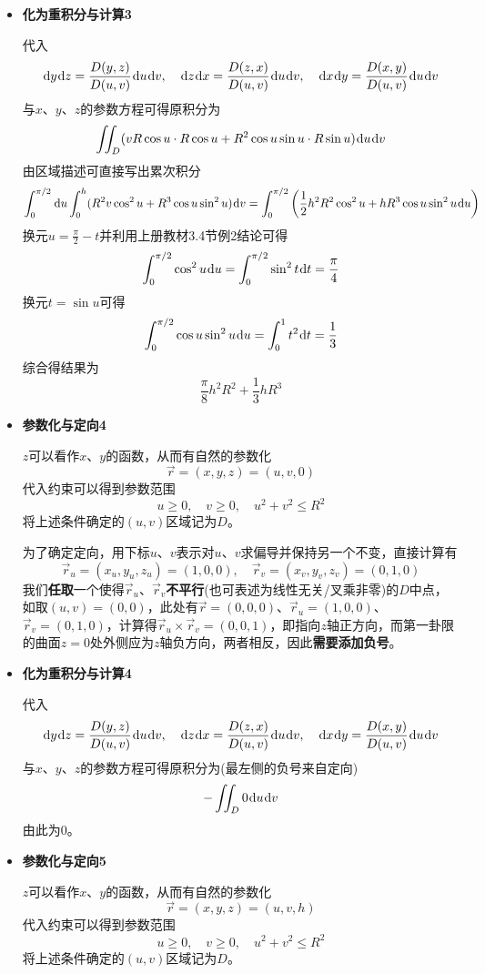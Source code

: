 \documentclass[a4paper,UTF8,fontset=windows,AutoFakeBold]{ctexart}
\newcommand*{\dr}{\hspace{0.07em}\mathrm{d}}
\newcommand*{\rv}{\vec{r}}
\theoremstyle{ex}
\begin{document}
\begin{enumerate}
{\begin{itemize}
            \item \textbf{化为重积分与计算3}
            
            代入
            $$\dr y\dr z=\frac{D(y,z)}{D(u,v)}\dr u\dr v,\quad\dr z\dr x=\frac{D(z,x)}{D(u,v)}\dr u\dr v,\quad\dr x\dr y=\frac{D(x,y)}{D(u,v)}\dr u\dr v$$
            与$x$、$y$、$z$的参数方程可得原积分为
            $$\iint_D(vR\cos u\cdot R\cos u+R^2\cos u\sin u\cdot R\sin u)\dr u\dr v$$
            由区域描述可直接写出累次积分
            $$\int_0^{\pi/2}\dr u\int_0^h(R^2v\cos^2u+R^3\cos u\sin^2u)\dr v=\int_0^{\pi/2}\bigg(\frac{1}{2}h^2R^2\cos^2u+hR^3\cos u\sin^2u\dr u\bigg)$$
            换元$u=\frac{\pi}{2}-t$并利用上册教材3.4节例2结论可得
            $$\int_0^{\pi/2}\cos^2u\dr u=\int_0^{\pi/2}\sin^2t\dr t=\frac{\pi}{4}$$
            换元$t=\sin u$可得
            $$\int_0^{\pi/2}\cos u\sin^2u\dr u=\int_0^1t^2\dr t=\frac{1}{3}$$
            综合得结果为
            $$\frac{\pi}{8}h^2R^2+\frac{1}{3}hR^3$$
            
            \item \textbf{参数化与定向4}
            
            $z$可以看作$x$、$y$的函数，从而有自然的参数化
            $$\vec{r}=(x,y,z)=(u,v,0)$$
            代入约束可以得到参数范围
            $$u\ge0,\quad v\ge0,\quad u^2+v^2\le R^2$$
            将上述条件确定的$(u,v)$区域记为$D$。

            为了确定定向，用下标$u$、$v$表示对$u$、$v$求偏导并保持另一个不变，直接计算有
            $$\rv_u=(x_u,y_u,z_u)=(1,0,0),\quad\rv_v=(x_v,y_v,z_v)=(0,1,0)$$
            我们\textbf{任取}一个使得$\rv_u$、$\rv_v$\textbf{不平行}(也可表述为线性无关/叉乘非零)的$D$中点，如取$(u,v)=(0,0)$，此处有$\rv=(0,0,0)$、$\rv_u=(1,0,0)$、$\rv_v=(0,1,0)$，计算得$\rv_u\times\rv_v=(0,0,1)$，即指向$z$轴正方向，而第一卦限的曲面$z=0$处外侧应为$z$轴负方向，两者相反，因此\textbf{需要添加负号}。

            \item \textbf{化为重积分与计算4}
            
            代入
            $$\dr y\dr z=\frac{D(y,z)}{D(u,v)}\dr u\dr v,\quad\dr z\dr x=\frac{D(z,x)}{D(u,v)}\dr u\dr v,\quad\dr x\dr y=\frac{D(x,y)}{D(u,v)}\dr u\dr v$$
            与$x$、$y$、$z$的参数方程可得原积分为(最左侧的负号来自定向)
            $$-\iint_D0\dr u\dr v$$
            由此为0。
            
            \item \textbf{参数化与定向5}
            
            $z$可以看作$x$、$y$的函数，从而有自然的参数化
            $$\vec{r}=(x,y,z)=(u,v,h)$$
            代入约束可以得到参数范围
            $$u\ge0,\quad v\ge0,\quad u^2+v^2\le R^2$$
            将上述条件确定的$(u,v)$区域记为$D$。


\end{itemize}}
\end{enumerate}
\end{document}
